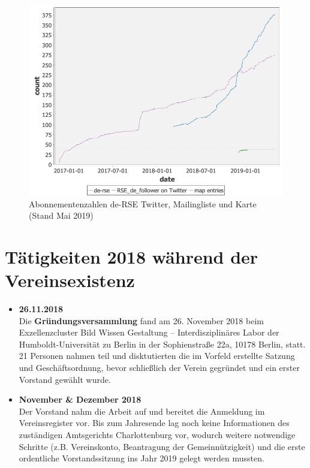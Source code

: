 \begin{figure}[htb]
  \centering
  \includegraphics[width=.75\textwidth]{2019_05_mailinglist_counter}
  \caption{Abonnementenzahlen de-RSE Twitter, Mailingliste und Karte (Stand Mai 2019) \label{fig:abo201905}}
\end{figure}

\section{Tätigkeiten 2018 während der Vereinsexistenz}

\begin{itemize}
 \item \textbf{26.11.2018}\\
  Die \textbf{Gründungsversammlung} fand am 26. November 2018 beim Exzellenzcluster Bild Wissen Gestaltung -- Interdisziplinäres Labor der Humboldt-Universität zu Berlin in der Sophienstraße 22a, 10178 Berlin, statt.
  21 Personen nahmen teil und disktutierten die im Vorfeld erstellte Satzung und Geschäftsordnung, bevor schließlich der Verein gegründet und ein erster Vorstand gewählt wurde.
 \item \textbf{November \& Dezember 2018}\\
  Der Vorstand nahm die Arbeit auf und bereitet die Anmeldung im Vereinsregister vor.
  Bis zum Jahresende lag noch keine Informationen des zuständigen Amtsgerichts Charlottenburg vor, wodurch weitere notwendige Schritte (z.B. Vereinskonto, Beantragung der Gemeinnützigkeit) und die erste ordentliche Vorstandssitzung ins Jahr 2019 gelegt werden mussten.
\end{itemize}




